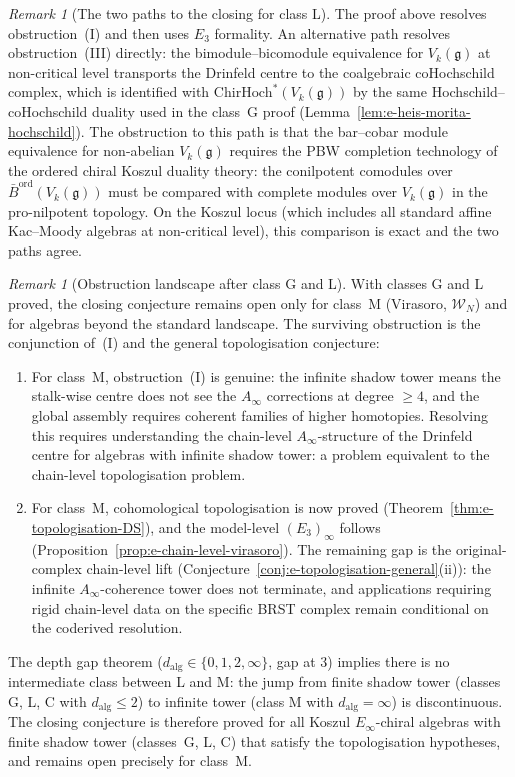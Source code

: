 \documentclass[11pt,reqno]{amsart}
\theoremstyle{definition}
\theoremstyle{remark}
\newtheorem{remark}[theorem]{Remark}
\providecommand{\cW}{\mathcal{W}}
\providecommand{\fg}{\mathfrak{g}}
\providecommand{\Ainf}{A_\infty}
\providecommand{\Ethree}{E_3}
\providecommand{\Einf}{E_\infty}
\providecommand{\Barord}{\bar{B}^{\mathrm{ord}}}
\providecommand{\ChirHoch}{\mathrm{ChirHoch}}
\begin{document}
\begin{remark}[The two paths to the closing for class L]
\label{rem:e-two-paths-class-l}
The proof above resolves obstruction~(I) and then uses
$\Ethree$ formality. An alternative path resolves
obstruction~(III) directly: the bimodule--bicomodule
equivalence for $V_k(\fg)$ at non-critical level
transports the Drinfeld centre to the coalgebraic
coHochschild complex, which is identified with
$\ChirHoch^*(V_k(\fg))$ by the same
Hochschild--coHochschild duality used in the class~G
proof (Lemma~\ref{lem:e-heis-morita-hochschild}).
The obstruction to this path is that the bar--cobar
module equivalence for non-abelian $V_k(\fg)$ requires
the PBW completion technology of the ordered chiral
Koszul duality theory: the conilpotent comodules over
$\Barord(V_k(\fg))$ must be compared with complete
modules over $V_k(\fg)$ in the pro-nilpotent topology.
On the Koszul locus (which includes all standard affine
Kac--Moody algebras at non-critical level), this comparison
is exact and the two paths agree.
\end{remark}

\begin{remark}[Obstruction landscape after class G and L]
\label{rem:e-obstruction-after-gl}
With classes G and L proved, the closing conjecture
remains open only for class~M (Virasoro,
$\cW_N$) and for algebras beyond the standard
landscape. The surviving obstruction is the
conjunction of~(I) and the general topologisation
conjecture:
\begin{enumerate}[label=\textup{(\roman*)}]
\item For class~M, obstruction~(I) is
 genuine: the infinite shadow tower means the
 stalk-wise centre does not see the $\Ainf$
 corrections at degree $\ge 4$, and the global
 assembly requires coherent families of higher
 homotopies. Resolving this requires understanding
 the chain-level $\Ainf$-structure of the
 Drinfeld centre for algebras with infinite shadow
 tower: a problem equivalent to the chain-level
 topologisation problem.
\item For class~M, cohomological topologisation is
 now proved
 (Theorem~\ref{thm:e-topologisation-DS}),
 and the model-level $(\Ethree)_\infty$ follows
 (Proposition~\ref{prop:e-chain-level-virasoro}).
 The remaining gap is the original-complex
 chain-level lift
 (Conjecture~\ref{conj:e-topologisation-general}(ii)):
 the infinite $\Ainf$-coherence tower does not
 terminate, and applications requiring rigid
 chain-level data on the specific BRST complex
 remain conditional on the coderived resolution.
\end{enumerate}
The depth gap theorem ($d_{\mathrm{alg}} \in \{0, 1, 2, \infty\}$,
gap at $3$) implies there is no intermediate class between
L and M: the jump from finite shadow tower (classes G, L, C
with $d_{\mathrm{alg}} \le 2$) to infinite tower
(class M with $d_{\mathrm{alg}} = \infty$) is discontinuous.
The closing conjecture is therefore proved for all Koszul
$\Einf$-chiral algebras with finite shadow tower
(classes~G, L, C) that satisfy the topologisation
hypotheses, and remains open precisely for class~M.
\end{remark}
\end{document}
